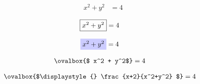 \documentclass{article}
\begin{document}
\begin{align}
    x^2 + y^2 &= 4
\end{align}

\begin{align}
   \fbox{$ x^2 + y^2$} &= 4
\end{align}

\begin{align}
   \colorbox{blue!20}{$ x^2 + y^2$} &= 4
\end{align}

\begin{align}
   \ovalbox{$ x^2 + y^2$} &= 4
\end{align}


\begin{align}
   \ovalbox{$\displaystyle{} \frac{x+2}{x^2+y^2} $} &= 4
\end{align}
\end{document}

